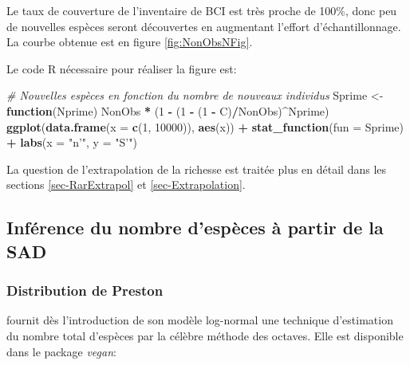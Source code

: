 \documentclass[
  11pt,
  french,
  a4paper,
  extrafontsizes,onecolumn,openright
  ]{memoir}
\newenvironment{Shaded}{\begin{snugshade}}{\end{snugshade}}
\newcommand{\CommentTok}[1]{\textcolor[rgb]{0.56,0.35,0.01}{\textit{#1}}}
\newcommand{\ControlFlowTok}[1]{\textcolor[rgb]{0.13,0.29,0.53}{\textbf{#1}}}
\newcommand{\DataTypeTok}[1]{\textcolor[rgb]{0.13,0.29,0.53}{#1}}
\newcommand{\DecValTok}[1]{\textcolor[rgb]{0.00,0.00,0.81}{#1}}
\newcommand{\KeywordTok}[1]{\textcolor[rgb]{0.13,0.29,0.53}{\textbf{#1}}}
\newcommand{\NormalTok}[1]{#1}
\newcommand{\OperatorTok}[1]{\textcolor[rgb]{0.81,0.36,0.00}{\textbf{#1}}}
\newcommand{\StringTok}[1]{\textcolor[rgb]{0.31,0.60,0.02}{#1}}
\begin{document}
\normalsize

Le taux de couverture de l'inventaire de BCI est très proche de 100\%, donc peu de nouvelles espèces seront découvertes en augmentant l'effort d'échantillonnage.
La courbe obtenue est en figure \ref{fig:NonObsNFig}.

Le code R nécessaire pour réaliser la figure est:

\scriptsize

\begin{Shaded}
\begin{Highlighting}[]
\CommentTok{# Nouvelles espèces en fonction du nombre de nouveaux individus}
\NormalTok{Sprime <-}\StringTok{ }\ControlFlowTok{function}\NormalTok{(Nprime) NonObs }\OperatorTok{*}\StringTok{ }\NormalTok{(}\DecValTok{1} \OperatorTok{-}\StringTok{ }\NormalTok{(}\DecValTok{1} \OperatorTok{-}\StringTok{ }\NormalTok{(}\DecValTok{1} \OperatorTok{-}\StringTok{ }\NormalTok{C)}\OperatorTok{/}\NormalTok{NonObs)}\OperatorTok{^}\NormalTok{Nprime)}
\KeywordTok{ggplot}\NormalTok{(}\KeywordTok{data.frame}\NormalTok{(}\DataTypeTok{x =} \KeywordTok{c}\NormalTok{(}\DecValTok{1}\NormalTok{, }\DecValTok{10000}\NormalTok{)), }\KeywordTok{aes}\NormalTok{(x)) }\OperatorTok{+}\StringTok{ }
\StringTok{  }\KeywordTok{stat_function}\NormalTok{(}\DataTypeTok{fun =}\NormalTok{ Sprime) }\OperatorTok{+}
\StringTok{  }\KeywordTok{labs}\NormalTok{(}\DataTypeTok{x =} \StringTok{"n'"}\NormalTok{, }\DataTypeTok{y =} \StringTok{"S'"}\NormalTok{)}
\end{Highlighting}
\end{Shaded}

\normalsize

La question de l'extrapolation de la richesse est traitée plus en détail dans les sections \ref{sec-RarExtrapol} et \ref{sec-Extrapolation}.

\hypertarget{infuxe9rence-du-nombre-despuxe8ces-uxe0-partir-de-la-sad}{%
\subsection{Inférence du nombre d'espèces à partir de la SAD}\label{infuxe9rence-du-nombre-despuxe8ces-uxe0-partir-de-la-sad}}

\hypertarget{distribution-de-preston}{%
\subsubsection{Distribution de Preston}\label{distribution-de-preston}}

\textcite{Preston1948} fournit dès l'introduction de son modèle log-normal une technique d'estimation du nombre total d'espèces par la célèbre méthode des octaves.
Elle est disponible dans le package \emph{vegan}:
\end{document}
